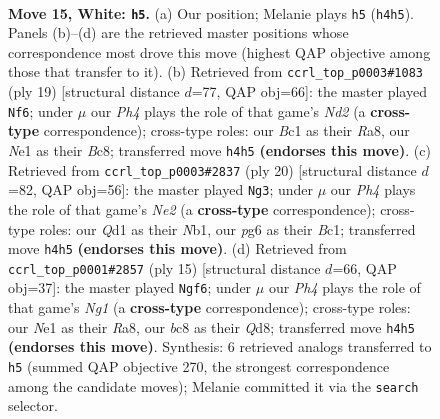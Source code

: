 \documentclass[11pt]{article}
\begin{document}
\clearpage

\begin{figure}[p]\centering
\begin{subfigure}{0.46\textwidth}\centering
\resizebox{\linewidth}{!}{%
\newchessgame
\chessboard[
  setfen={nrb2rk1/pp2npbp/3q2p1/2p1p3/6PP/3PP3/PP3PBK/RNBQNR2 w - - 1 15},
  showmover=false,
  pgfstyle=straightmove, color=movearrow, markmove={h4-h5}
]}
\caption{}
\end{subfigure}\hfill
\begin{subfigure}{0.46\textwidth}\centering
\resizebox{\linewidth}{!}{%
\newchessgame
\chessboard[
  setfen={r1bqk2r/pp1n1ppp/3b4/2p5/3pB3/3P2P1/PPP1NP1P/R1BQ1RK1 b kq - 0 10},
  showmover=false,
  pgfstyle=straightmove, color=movearrow, markmove={d7-f6}
]}
\caption{}
\end{subfigure}
\\[4pt]
\begin{subfigure}{0.46\textwidth}\centering
\resizebox{\linewidth}{!}{%
\newchessgame
\chessboard[
  setfen={rnbq1rk1/4bppp/p2p1n2/1p2p3/4P1P1/7P/PPP1NPB1/RNBQK2R w KQ - 1 11},
  showmover=false,
  pgfstyle=straightmove, color=movearrow, markmove={e2-g3}
]}
\caption{}
\end{subfigure}\hfill
\begin{subfigure}{0.46\textwidth}\centering
\resizebox{\linewidth}{!}{%
\newchessgame
\chessboard[
  setfen={r2qk1nr/pppn1ppp/2bb4/4p3/2Q1P3/5NP1/PP1P1PBP/RNB2RK1 b kq - 0 8},
  showmover=false,
  pgfstyle=straightmove, color=movearrow, markmove={g8-f6}
]}
\caption{}
\end{subfigure}
\caption{\textbf{Move 15, White: \texttt{h5}.} (a) Our position; Melanie plays \texttt{h5} (\texttt{h4h5}). Panels (b)--(d) are the retrieved master positions whose correspondence most drove this move (highest QAP objective among those that transfer to it). (b) Retrieved from \texttt{ccrl\_top\_p0003\#1083} (ply 19) [structural distance $d$=77, QAP obj=66]: the master played \texttt{Nf6}; under $\mu$ our \emph{Ph4} plays the role of that game's \emph{Nd2} (a \textbf{cross-type} correspondence); cross-type roles: our \emph{B}c1 as their \emph{R}a8, our \emph{N}e1 as their \emph{B}c8; transferred move \texttt{h4h5} \textbf{(endorses this move)}. (c) Retrieved from \texttt{ccrl\_top\_p0003\#2837} (ply 20) [structural distance $d$=82, QAP obj=56]: the master played \texttt{Ng3}; under $\mu$ our \emph{Ph4} plays the role of that game's \emph{Ne2} (a \textbf{cross-type} correspondence); cross-type roles: our \emph{Q}d1 as their \emph{N}b1, our \emph{p}g6 as their \emph{B}c1; transferred move \texttt{h4h5} \textbf{(endorses this move)}. (d) Retrieved from \texttt{ccrl\_top\_p0001\#2857} (ply 15) [structural distance $d$=66, QAP obj=37]: the master played \texttt{Ngf6}; under $\mu$ our \emph{Ph4} plays the role of that game's \emph{Ng1} (a \textbf{cross-type} correspondence); cross-type roles: our \emph{N}e1 as their \emph{R}a8, our \emph{b}c8 as their \emph{Q}d8; transferred move \texttt{h4h5} \textbf{(endorses this move)}. Synthesis: 6 retrieved analogs transferred to \texttt{h5} (summed QAP objective 270, the strongest correspondence among the candidate moves); Melanie committed it via the \texttt{search} selector.}
\label{fig:thought-m28}
\end{figure}
\end{document}
